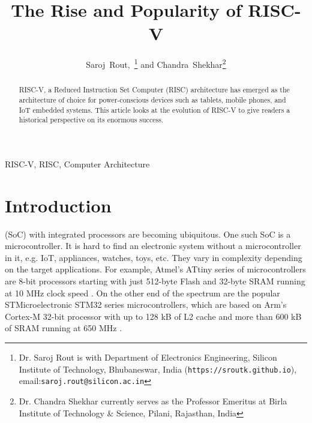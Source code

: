 \documentclass[journal]{IEEEtran}
\begin{document}
%
\title{The Rise and Popularity of RISC-V}
%
\author{Saroj~Rout,~\thanks{Dr. Saroj Rout is with Department of Electronics Engineering, Silicon Institute of Technology, Bhubaneswar, India (\texttt{https://sroutk.github.io}), email:\texttt{saroj.rout@silicon.ac.in}} and Chandra~Shekhar\thanks{Dr. Chandra Shekhar currently serves as the Professor Emeritus at Birla Institute of Technology \& Science, Pilani, Rajasthan, India} }


\maketitle

\begin{abstract}

RISC-V, a Reduced Instruction Set Computer (RISC) architecture has emerged as the architecture of choice for power-conscious devices such as tablets, mobile phones, and IoT embedded systems. This article looks at the evolution of RISC-V to give readers a historical perspective on its enormous success.  

\end{abstract}



\begin{IEEEkeywords}
RISC-V, RISC, Computer Architecture
\end{IEEEkeywords}

\section{Introduction}

 (SoC) with integrated processors are becoming ubiquitous. One such SoC is a microcontroller. It is hard to find an electronic system without a microcontroller in it, e.g. IoT, appliances, watches, toys, etc. They vary in complexity depending on the target applications. For example, Atmel's ATtiny series of microcontrollers are 8-bit processors starting with just 512-byte Flash and 32-byte SRAM running at 10 MHz clock speed \cite{microchip_attiny85_nodate}. On the other end of the spectrum are the popular STMicroelectronic STM32 series microcontrollers, which are based on Arm's Cortex-M 32-bit processor with up to 128 kB of L2 cache and more than 600 kB of SRAM running at 650 MHz \cite{stmicroelectronics_stm32_nodate}.
\end{document}
